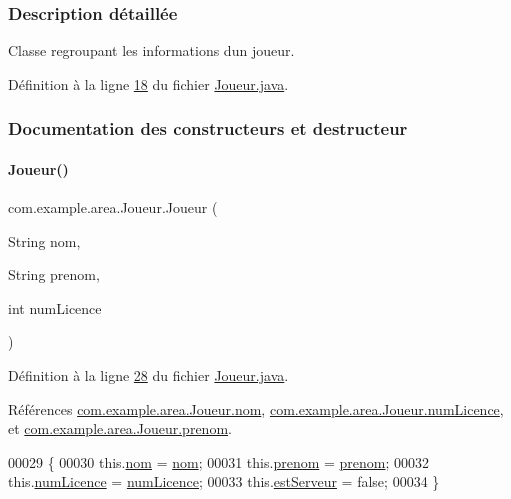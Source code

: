 \subsubsection{Description détaillée}
Classe regroupant les informations d\textquotesingle{}un joueur. 

Définition à la ligne \hyperlink{_joueur_8java_source_l00018}{18} du fichier \hyperlink{_joueur_8java_source}{Joueur.\+java}.



\subsubsection{Documentation des constructeurs et destructeur}
\mbox{\label{classcom_1_1example_1_1area_1_1_joueur_a62953f37425da88ba6e6e2426ab67afc}} 
\paragraph{\texorpdfstring{Joueur()}{Joueur()}}
{\footnotesize\ttfamily com.\+example.\+area.\+Joueur.\+Joueur (\begin{DoxyParamCaption}\item[{String}]{nom,  }\item[{String}]{prenom,  }\item[{int}]{num\+Licence }\end{DoxyParamCaption})}



Définition à la ligne \hyperlink{_joueur_8java_source_l00028}{28} du fichier \hyperlink{_joueur_8java_source}{Joueur.\+java}.



Références \hyperlink{_joueur_8java_source_l00023}{com.\+example.\+area.\+Joueur.\+nom}, \hyperlink{_joueur_8java_source_l00025}{com.\+example.\+area.\+Joueur.\+num\+Licence}, et \hyperlink{_joueur_8java_source_l00024}{com.\+example.\+area.\+Joueur.\+prenom}.


\begin{DoxyCode}
00029       \{
00030           this.\hyperlink{classcom_1_1example_1_1area_1_1_joueur_a98dde75942f6a48d9acf0abb67742dc3}{nom} = \hyperlink{classcom_1_1example_1_1area_1_1_joueur_a98dde75942f6a48d9acf0abb67742dc3}{nom};
00031           this.\hyperlink{classcom_1_1example_1_1area_1_1_joueur_a9a49f14719dfc48cf557ef8677e2b2bc}{prenom} = \hyperlink{classcom_1_1example_1_1area_1_1_joueur_a9a49f14719dfc48cf557ef8677e2b2bc}{prenom};
00032           this.\hyperlink{classcom_1_1example_1_1area_1_1_joueur_a559bd07d0a47e8fc1ec3050890f00589}{numLicence} = \hyperlink{classcom_1_1example_1_1area_1_1_joueur_a559bd07d0a47e8fc1ec3050890f00589}{numLicence};
00033           this.\hyperlink{classcom_1_1example_1_1area_1_1_joueur_ad35bff2a14331bada30ccc164d25f50f}{estServeur} = \textcolor{keyword}{false};
00034       \}
\end{DoxyCode}


